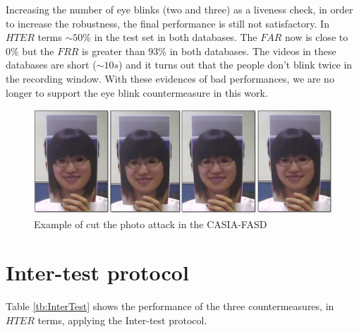 Increasing the number of eye blinks (two and three) as a liveness check, in order to increase the robustness, the final performance is still not satisfactory. In $HTER$ terms $\sim 50\%$ in the test set in both databases. The $FAR$ now is close to $0\%$ but the $FRR$ is greater than $93\%$ in both databases. The videos in these databases are short ($\sim10s$) and it turns out that the people don't blink twice in the recording window. With these evidences of bad performances, we are no longer to support the eye blink countermeasure in this work.

\begin{figure}[!btb]
\begin{center}
\includegraphics [width=15cm] {images/blink_scene.pdf}
\caption[Example of the cut photo attack in the CASIA-FASD]{Example of cut the photo attack in the CASIA-FASD}
\label{fig:blink_scene}
\end{center}
\end{figure}


\section{Inter-test protocol}
\label{sec:Inter_test}

Table \ref{tb:InterTest} shows the performance of the three countermeasures, in $HTER$ terms, applying the Inter-test protocol.

